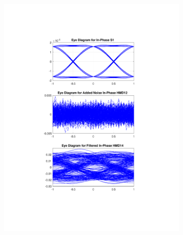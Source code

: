 \begin{figure}[H]
	\centering
	\begin{subfigure}{.45\textwidth}
		\centering
		\includegraphics[clip, trim=5cm 4cm 5cm 4cm, width=\textwidth]{./sdf/m_qam_system/figures/eyes/if_n_p_60_09_rc.pdf}
	\end{subfigure}
	\begin{subfigure}{.45\textwidth}
		\centering

\end{subfigure}
\end{figure}

